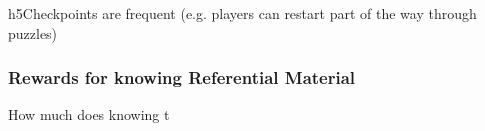 h{5}Checkpoints are frequent (e.g. players can restart part of the way through puzzles)\subsubsection{Rewards for knowing Referential Material}How much does knowing t
